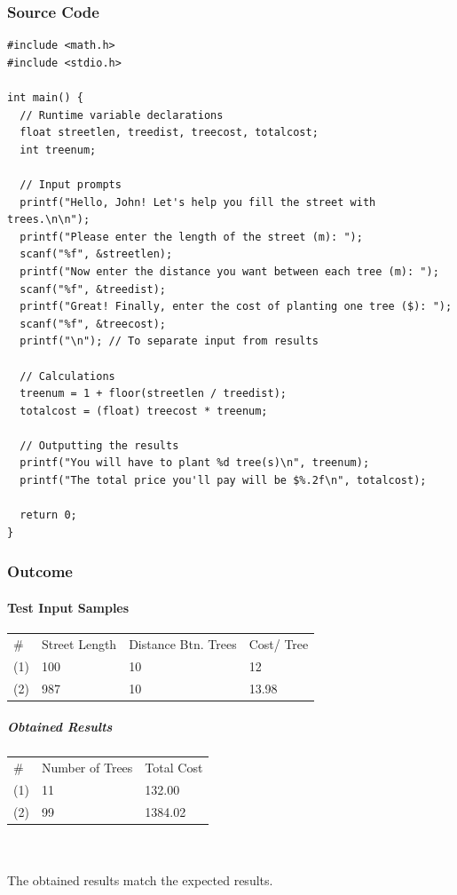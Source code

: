 \documentclass[a4paper,11pt]{article}
\theoremstyle{mytheor}
\theoremstyle{mytheor}
\begin{document}
\subsubsection{Source Code}
\begin{lstlisting}[escapechar=\^,label={list:first},title=Program's \texttt{\color{inlinecode}{main.c}} File -- console input/output-oriented application to solve the problem]
#include <math.h>
#include <stdio.h>

int main() {
  // Runtime variable declarations
  float streetlen, treedist, treecost, totalcost;
  int treenum;

  // Input prompts
  printf("Hello, John! Let's help you fill the street with trees.\n\n");
  printf("Please enter the length of the street (m): ");
  scanf("%f", &streetlen);
  printf("Now enter the distance you want between each tree (m): ");
  scanf("%f", &treedist);
  printf("Great! Finally, enter the cost of planting one tree ($): ");
  scanf("%f", &treecost);
  printf("\n"); // To separate input from results

  // Calculations
  treenum = 1 + floor(streetlen / treedist);
  totalcost = (float) treecost * treenum;

  // Outputting the results
  printf("You will have to plant %d tree(s)\n", treenum);
  printf("The total price you'll pay will be $%.2f\n", totalcost);

  return 0;
}
\end{lstlisting}
\newpage
\subsubsection{Outcome}
\paragraph{Test Input Samples\\}

\begin{tabular}{ l l l l }
\# & Street Length & Distance Btn. Trees & Cost/ Tree\\
(1) & 100 & 10 & 12\\
(2) & 987 & 10 & 13.98\\
\end{tabular}
\subparagraph{Obtained Results}

\begin{tabular}{ l l l }
\# & Number of Trees & Total Cost\\
(1) & 11 & 132.00 \\
(2) & 99 & 1384.02 \\
\end{tabular}
\\\\The obtained results match the expected results.
\end{document}
